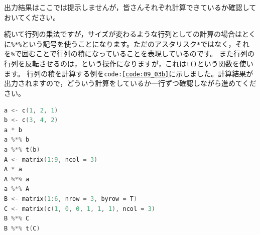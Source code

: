 \documentclass{ltjsbook}
\begin{document}
出力結果はここでは提示しませんが，皆さんそれぞれ計算できているか確認しておいてください。

続いて行列の乗法ですが，サイズが変わるような行列としての計算の場合はとくに\verb|%*%|という記号を使うことになります。ただのアスタリスク\verb|*|ではなく，それを\verb|%|で囲むことで行列の積になっていることを表現しているのです。
また行列の行列を反転させるのは，という操作になりますが，これは\texttt{t()}という関数を使います。
行列の積を計算する例を\texttt{code:\ref{code:09_03b}}に示しました。計算結果が出力されますので，どういう計算をしているか一行ずつ確認しながら進めてください。

\begin{lstlisting}[language=c++,label={code:09_03b},caption={行列の積}]
a <- c(1, 2, 1)
b <- c(3, 4, 2)
a * b
a %*% b
a %*% t(b)
A <- matrix(1:9, ncol = 3)
A * a
A %*% a
a %*% A
B <- matrix(1:6, nrow = 3, byrow = T)
C <- matrix(c(1, 0, 0, 1, 1, 1), ncol = 3)
B %*% C
B %*% t(C)
\end{lstlisting}
\end{document}
